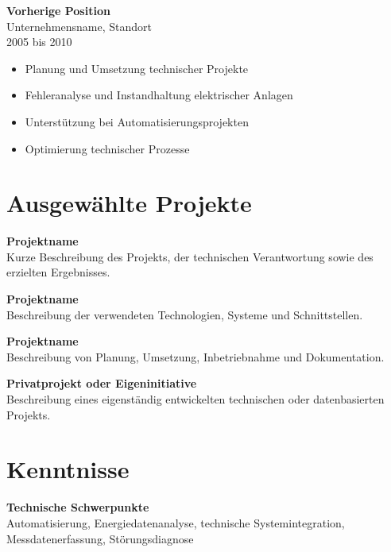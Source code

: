 \documentclass[11pt,a4paper]{article}
\begin{document}
\vspace{0.4cm}

\textbf{Vorherige Position}\\
Unternehmensname, Standort\\
2005 bis 2010

\begin{itemize}
\item Planung und Umsetzung technischer Projekte
\item Fehleranalyse und Instandhaltung elektrischer Anlagen
\item Unterstützung bei Automatisierungsprojekten
\item Optimierung technischer Prozesse
\end{itemize}


\section*{Ausgewählte Projekte}

\textbf{Projektname}\\
Kurze Beschreibung des Projekts, der technischen Verantwortung sowie des erzielten Ergebnisses.

\vspace{0.45cm}

\textbf{Projektname}\\
Beschreibung der verwendeten Technologien, Systeme und Schnittstellen.

\vspace{0.45cm}

\textbf{Projektname}\\
Beschreibung von Planung, Umsetzung, Inbetriebnahme und Dokumentation.

\vspace{0.45cm}

\textbf{Privatprojekt oder Eigeninitiative}\\
Beschreibung eines eigenständig entwickelten technischen oder datenbasierten Projekts.


\section*{Kenntnisse}

\textbf{Technische Schwerpunkte}\\
Automatisierung, Energiedatenanalyse, technische Systemintegration, Messdatenerfassung, Störungsdiagnose
\end{document}
